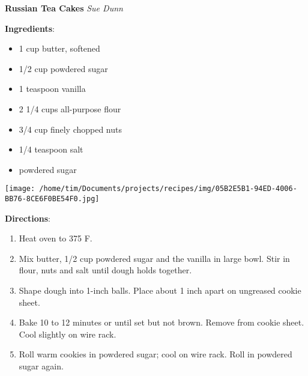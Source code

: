 \documentclass[11pt, twoside, openany]{book}
\begin{document}
\noindent\begin{minipage}[t]{\linewidth}%
{\Large\textbf{Russian Tea Cakes}} \label{russian-tea-cakes}\hfill\textit{Sue Dunn}\\
\noindent\begin{minipage}[t]{0.78\linewidth}%
\textbf{Ingredients}:\vspace{-3mm}
\begin{multicols}{2}
\begin{itemize}\setlength\itemsep{-1mm}
\item 1 cup butter, softened
\item 1/2 cup powdered sugar
\item 1 teaspoon vanilla
\item 2 1/4 cups all-purpose flour
\item 3/4 cup finely chopped nuts
\item 1/4 teaspoon salt
\item powdered sugar
\end{itemize}
\end{multicols}
\end{minipage}
\noindent\begin{minipage}[t]{0.18\linewidth}
\centering \strut\vspace*{-\baselineskip}\newline
\texttt{[image: /home/tim/Documents/projects/recipes/img/05B2E5B1-94ED-4006-BB76-8CE6F0BE54F0.jpg]}\\
\end{minipage}\vspace{3mm}
\textbf{Directions}:
\vspace{-3mm}\begin{enumerate}\setlength\itemsep{-1mm}
\item Heat oven to 375 F.
\item Mix butter, 1/2 cup powdered sugar and the vanilla in large bowl. Stir in flour, nuts and salt until dough holds together.
\item Shape dough into 1-inch balls. Place about 1 inch apart on ungreased cookie sheet.
\item Bake 10 to 12 minutes or until set but not brown. Remove from cookie sheet. Cool slightly on wire rack.
\item Roll warm cookies in powdered sugar; cool on wire rack. Roll in powdered sugar again.
\end{enumerate}
\end{minipage}\vspace{8mm}
\end{document}

